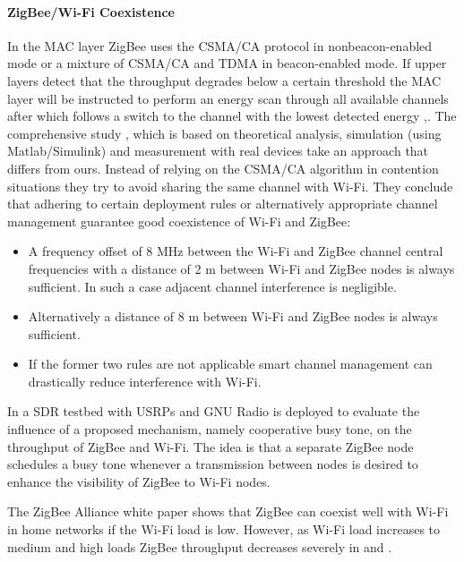 \paragraph{ZigBee/Wi-Fi Coexistence}

In the MAC layer ZigBee uses the CSMA/CA protocol in nonbeacon-enabled mode or a mixture of CSMA/CA and TDMA in beacon-enabled mode. If upper layers detect that the throughput degrades below a certain threshold the MAC layer will be instructed to perform an energy scan through all available channels after which follows a switch to the channel with the lowest detected energy \cite{yi11},\cite{zhang11}. 
The comprehensive study \cite{yi11}, which is based on theoretical analysis, simulation (using Matlab/Simulink) and measurement with real devices take an approach that differs from ours. Instead of relying on the CSMA/CA algorithm in contention situations they try to avoid sharing the same channel with Wi-Fi. They conclude that adhering to certain deployment rules or alternatively appropriate channel management guarantee good coexistence of Wi-Fi and ZigBee:
\begin{itemize}
	\item A frequency offset of 8 MHz between the Wi-Fi and ZigBee channel central frequencies with a distance of 2 m between Wi-Fi and ZigBee nodes is always sufficient. In such a case adjacent channel interference is negligible.
	\item Alternatively a distance of 8 m between Wi-Fi and ZigBee nodes is always sufficient.
	\item If the former two rules are not applicable smart channel management can drastically reduce interference with Wi-Fi.
\end{itemize}

In \cite{zhang11} a SDR testbed with USRPs and GNU Radio is deployed to evaluate the influence of a proposed mechanism, namely cooperative busy tone, on the throughput of ZigBee and Wi-Fi. The idea is that a separate ZigBee node schedules a busy tone whenever a transmission between nodes is desired to enhance the visibility of ZigBee to Wi-Fi nodes.

The ZigBee Alliance white paper \cite{thonet08} shows that ZigBee can coexist well with Wi-Fi in home networks if the Wi-Fi load is low. However, as Wi-Fi load increases to medium and high loads ZigBee throughput decreases severely in \cite{gummadi09} and \cite{polin08}. 


